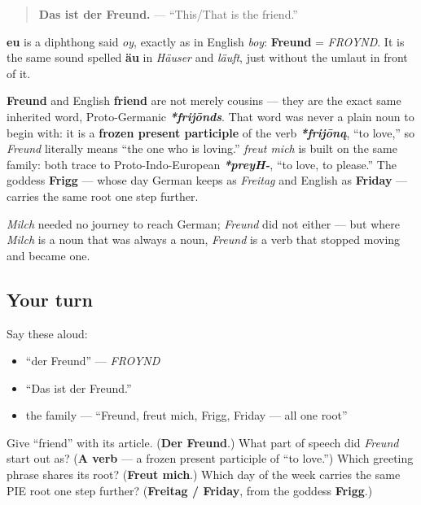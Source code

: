 \begin{quote}
\textbf{Das ist der Freund.} — \textquotedblleft{}This/That is the friend.\textquotedblright{}
\end{quote}

\begin{sounds}
\textbf{eu} is a diphthong said \emph{oy}, exactly as in English \emph{boy}: \textbf{Freund} = \emph{FROYND}. It is the same sound spelled \textbf{äu} in \emph{Häuser} and \emph{läuft}, just without the umlaut in front of it.
\end{sounds}

\begin{cousinweb}
\textbf{Freund} and English \textbf{friend} are not merely cousins — they are the exact same inherited word, Proto-Germanic \emph{\textbf{*frijōnds}}. That word was never a plain noun to begin with: it is a \textbf{frozen present participle} of the verb \emph{\textbf{*frijōną}}, \textquotedblleft{}to love,\textquotedblright{} so \emph{Freund} literally means \textquotedblleft{}the one who is loving.\textquotedblright{} \emph{freut mich} is built on the same family: both trace to Proto-Indo-European \emph{\textbf{*preyH-}}, \textquotedblleft{}to love, to please.\textquotedblright{} The goddess \textbf{Frigg} — whose day German keeps as \emph{Freitag} and English as \textbf{Friday} — carries the same root one step further.

\emph{Milch} needed no journey to reach German; \emph{Freund} did not either — but where \emph{Milch} is a noun that was always a noun, \emph{Freund} is a verb that stopped moving and became one.
\end{cousinweb}

\subsection*{Your turn}
Say these aloud:

\begin{itemize}
\raggedright
  \item \textquotedblleft{}der Freund\textquotedblright{} — \emph{FROYND}
  \item \textquotedblleft{}Das ist der Freund.\textquotedblright{}
  \item the family — \textquotedblleft{}Freund, freut mich, Frigg, Friday — all one root\textquotedblright{}
\end{itemize}

\begin{tcolorbox}[breakable,colback=teal!4,colframe=teal!35!black,title={Before you move on}]
Give \textquotedblleft{}friend\textquotedblright{} with its article. (\textbf{Der Freund}.) What part of speech did \emph{Freund} start out as? (\textbf{A verb} — a frozen present participle of \textquotedblleft{}to love.\textquotedblright{}) Which greeting phrase shares its root? (\textbf{Freut mich}.) Which day of the week carries the same PIE root one step further? (\textbf{Freitag / Friday}, from the goddess \textbf{Frigg}.)
\end{tcolorbox}
